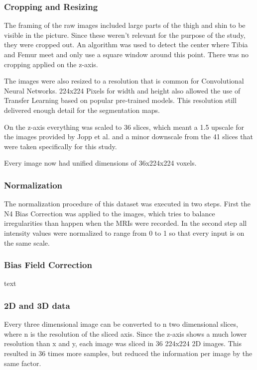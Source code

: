 \subsubsection{Cropping and Resizing}

The framing of the raw images included large parts of the thigh and shin to be visible in the picture. Since these weren't relevant for the purpose of the study, they were cropped out. An algorithm was used to detect the center where Tibia and Femur meet and only use a square window around this point. There was no cropping applied on the z-axis.

The images were also resized to a resolution that is common for Convolutional Neural Networks. 224x224 Pixels for width and height also allowed the use of Transfer Learning based on popular pre-trained models. This resolution still delivered enough detail for the segmentation maps.

On the z-axis everything was scaled to 36 slices, which meant a 1.5 upscale for the images provided by Jopp et al. and a minor downscale from the 41 slices that were taken specifically for this study.

Every image now had unified dimensions of 36x224x224 voxels.

\subsubsection{Normalization}

The normalization procedure of this dataset was executed in two steps. First the N4 Bias Correction was applied to the images, which tries to balance irregularities than happen when the MRIs were recorded. In the second step all intensity values were normalized to range from 0 to 1 so that every input is on the same scale.

\subsubsection{Bias Field Correction}

text

\subsubsection{2D and 3D data}

Every three dimensional image can be converted to n two dimensional slices, where n is the resolution of the sliced axis. Since the z-axis shows a much lower resolution than x and y, each image was sliced in 36 224x224 2D images. This resulted in 36 times more samples, but reduced the information per image by the same factor. 

